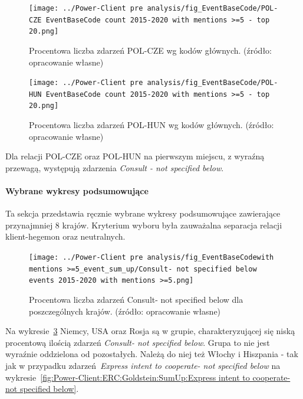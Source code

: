 \documentclass[11pt]{report}
\begin{document}
    \begin{figure}[!htp]
        \centering
        \texttt{[image: ../Power-Client pre analysis/fig\_EventBaseCode/POL-CZE EventBaseCode count 2015-2020 with mentions >=5 - top 20.png]}
        \caption{Procentowa liczba zdarzeń POL-CZE wg kodów głównych. (źródło: opracowanie własne)}
        \label{fig:Power-Client:EBC:Mentions:POL-CZE}
    \end{figure}

    \begin{figure}[!htp]
        \centering
        \texttt{[image: ../Power-Client pre analysis/fig\_EventBaseCode/POL-HUN EventBaseCode count 2015-2020 with mentions >=5 - top 20.png]}
        \caption{Procentowa liczba zdarzeń POL-HUN wg kodów głównych. (źródło: opracowanie własne)}
        \label{fig:Power-Client:EBC:Mentions:POL-HUN}
    \end{figure}

    Dla relacji POL-CZE oraz POL-HUN na pierwszym miejscu, z wyraźną przewagą, występują zdarzenia \textit{Consult - not specified below}.

    \paragraph{Wybrane wykresy podsumowujące}
    Ta sekcja przedstawia ręcznie wybrane wykresy podsumowujące zawierające przynajmniej 8 krajów.
    Kryterium wyboru była zauważalna separacja relacji klient-hegemon oraz neutralnych.

    \begin{figure}[!htp]
        \centering
        \texttt{[image: ../Power-Client pre analysis/fig\_EventBaseCodewith mentions >=5\_event\_sum\_up/Consult- not specified below events 2015-2020 with mentions >=5.png]}
        \caption{Procentowa liczba zdarzeń Consult- not specified below dla poszczególnych krajów. (źródło: opracowanie własne)}
        \label{fig:Power-Client:ERC:Mentions:SumUp:Consult- not specified below}
    \end{figure}
    Na wykresie~\ref{fig:Power-Client:ERC:Mentions:SumUp:Consult- not specified below} Niemcy, USA oraz Rosja są w grupie,
    charakteryzującej się niską procentową ilością zdarzeń \textit{Consult- not specified below}.
    Grupa to nie jest wyraźnie oddzielona od pozostałych.
    Należą do niej też Włochy i Hiszpania - tak jak w przypadku zdarzeń~\textit{Express intent to cooperate- not specified below}
    na wykresie~\ref{fig:Power-Client:ERC:Goldstein:SumUp:Express intent to cooperate- not specified below}.
\end{document}
